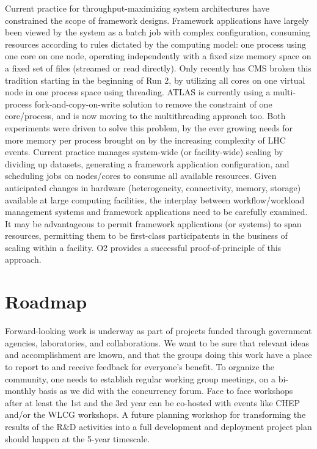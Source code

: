 \documentclass[12pt,a4paper]{article}
\begin{document}
Current practice for throughput-maximizing system architectures have
constrained the scope of framework designs. Framework applications
have largely been viewed by the system as a batch job with complex
configuration, consuming resources according to rules dictated by the
computing model: one process using one core on one node, operating
independently with a fixed size memory space on a fixed set of files
(streamed or read directly). Only recently has CMS broken this
tradition starting in the beginning of Run 2, by utilizing all cores
on one virtual node in one process space using threading. ATLAS is
currently using a multi-process fork-and-copy-on-write solution to
remove the constraint of one core/process, and is now moving to the 
multithreading approach too. Both experiments were
driven to solve this problem, by the ever growing needs for more
memory per process brought on by the increasing complexity of LHC
events. Current practice manages system-wide (or facility-wide)
scaling by dividing up datasets, generating a framework application
configuration, and scheduling jobs on nodes/cores to consume all
available resources. Given anticipated changes in hardware
(heterogeneity, connectivity, memory, storage) available at large
computing facilities, the interplay between workflow/workload
management systems and framework applications need to be carefully
examined. It may be advantageous to permit framework applications (or
systems) to span resources, permitting them to be first-class
participatents in the business of scaling within a facility. O2 provides
a successful proof-of-principle of this approach.


\section{Roadmap}
\label{sec:roadmap}
Forward-looking work is underway as part of projects funded through government agencies, laboratories, and collaborations.  We want to be sure that relevant ideas and accomplishment are known, and that the groups doing this work have a place to report to and receive feedback for everyone’s benefit. 
To organize the community, one needs to establish regular working group meetings, on a bi-monthly basis as we did with the concurrency forum. Face to face workshops after at least the 1st and the 3rd year can be co-hosted with events like CHEP and/or the WLCG workshops. A future planning workshop for transforming the results of the R\&D activities into a full development and deployment project plan should happen at the 5-year timescale.
\end{document}
